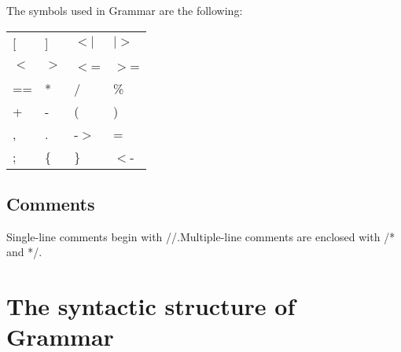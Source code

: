 \documentclass{article}
\begin{document}
The symbols used in Grammar are the following:

\begin{center}\begin{tabular}{llll}
[ & ] & $<$$|$ & $|$$>$ \\
$<$ & $>$ & $<$= & $>$= \\
== & * & / & \% \\
+ & - & ( & ) \\
, & . & -$>$ & = \\
; & \{ & \} & $<$- \\
\end{tabular}\end{center}

\subsection{Comments}

Single-line comments begin with //.Multiple-line comments are  enclosed with /* and */.

\section{The syntactic structure of Grammar}
\end{document}
